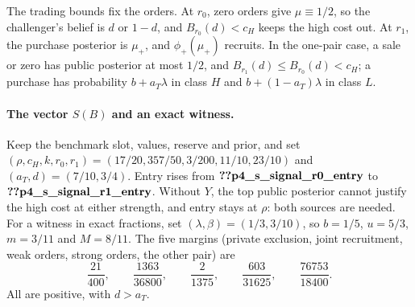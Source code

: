 The trading bounds fix the orders. At \(r_0\), zero orders give \(\mu\equiv1/2\), so the challenger's belief is \(d\) or
\(1-d\), and \(B_{r_0}(d)<c_H\) keeps the high cost out. At \(r_1\), the purchase posterior is \(\mu_+\), and
\(\phi_+(\mu_+)\) recruits. In the one-pair case, a sale or zero has public posterior at most \(1/2\), and
\(B_{r_1}(d)\le B_{r_0}(d)<c_H\); a purchase has probability \(b+a_T\lambda\) in class \(H\) and \(b+(1-a_T)\lambda\) in
class \(L\).

\paragraph{The vector \(S(B)\) and an exact witness.}
Keep the benchmark slot, values, reserve and prior, and set \((\rho,c_H,k,r_0,r_1)=(17/20,357/50,3/200,11/10,23/10)\)
and \((a_T,d)=(7/10,3/4)\). Entry rises from \(\reg{p4_s_signal_r0_entry}\) to \(\reg{p4_s_signal_r1_entry}\). Without
\(Y\), the top public posterior cannot justify the high cost at either strength, and entry stays at \(\rho\): both
sources are needed. For a witness in exact fractions, set \((\lambda,\beta)=(1/3,3/10)\), so \(b=1/5\), \(u=5/3\),
\(m=3/11\) and \(M=8/11\). The five margins (private exclusion, joint recruitment, weak orders, strong orders, the
other pair) are
\[
\frac{21}{400},\qquad\frac{1363}{36800},\qquad\frac{2}{1375},\qquad\frac{603}{31625},\qquad\frac{76753}{18400}.
\]
All are positive, with \(d>a_T\).

